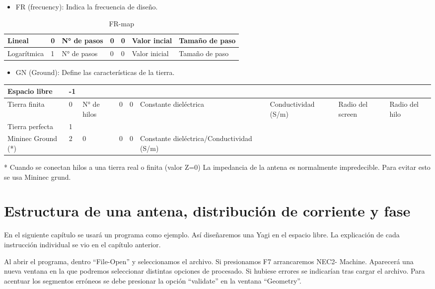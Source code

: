 \documentclass[12pt]{article}
\begin{document}
\begin{itemize}
    \item FR (frecuency): Indica la frecuencia de diseño.
\end{itemize}

\begin{table}[H]
    \centering
    \begin{tabular}{|l|l|l|l|l|l|l|}
	\hline
	Lineal&0&N° de pasos&0&0&Valor incial&Tamaño de paso\\\hline
	Logar\'itmica&1&N° de pasos&0&0&Valor inicial&Tamaño de paso\\\hline
    \end{tabular}
    \caption{FR-map}
\end{table}

\begin{itemize}
    \item GN (Ground): Define las caracter\'isticas de la tierra.
\end{itemize}

\begin{table}[H]
    \centering
    \begin{tabularx}{\textwidth}{|X|X|X|X|X|X|X|X|X|}
	\hline
	Espacio libre&-1&&&&&&&\\\hline
	Tierra finita&0&N° de hilos&0&0&Cons\-tante diel\'ectrica&Conduc\-tividad (S/m)&Radio del screen&Radio del hilo\\ \hline
	Tierra perfecta&1&&&&&&&\\\hline
	Mininec Ground (*)&2&0&0&0&Con\-stante diel\'ectrica/Conductividad (S/m)&&&\\\hline
    \end{tabularx}
    \raggedright 
    * Cuando se conectan hilos a una tierra real o finita (valor Z=0) La impedancia de la antena es normalmente impredecible. Para evitar esto se usa Mininec grund.
\end{table}

\section{Estructura de una antena, distribuci\'on de corriente y fase}

En el siguiente capítulo se usará un programa como ejemplo. Así diseñaremos una Yagi en el espacio libre. La explicación de cada instrucción individual se vio en el capítulo anterior.

Al abrir el programa, dentro “File-Open” y seleccionamos el archivo. Si presionamos F7 arrancaremos NEC2- Machine. Aparecerá una nueva ventana en la que podremos seleccionar distintas opciones de procesado. Si hubiese errores se indicarían tras cargar el archivo. Para acentuar los segmentos erróneos se debe presionar la opci\'on ``validate'' en la ventana ``Geometry''.
\end{document}
